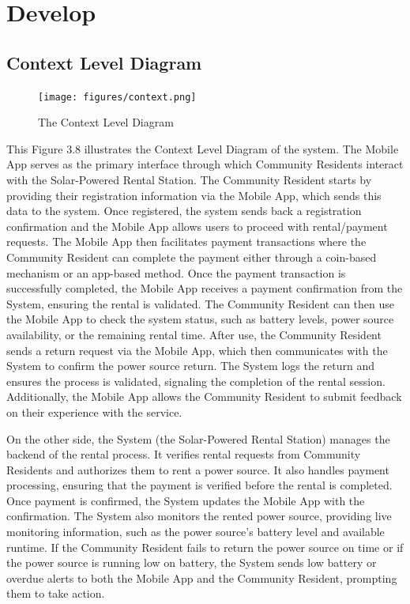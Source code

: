 {\section{Develop}

\subsection{Context Level Diagram}

\begin{figure}[H]
	\centering
	\caption{The Context Level Diagram}
	\label{fig:context level diagram}
	\texttt{[image: figures/context.png]}
\end{figure}

This Figure 3.8 illustrates the Context Level Diagram of the system. The Mobile App serves as the primary interface through which Community Residents interact with the Solar-Powered Rental Station. The Community Resident starts by providing their registration information via the Mobile App, which sends this data to the system. Once registered, the system sends back a registration confirmation and the Mobile App allows users to proceed with rental/payment requests. The Mobile App then facilitates payment transactions where the Community Resident can complete the payment either through a coin-based mechanism or an app-based method. Once the payment transaction is successfully completed, the Mobile App receives a payment confirmation from the System, ensuring the rental is validated. The Community Resident can then use the Mobile App to check the system status, such as battery levels, power source availability, or the remaining rental time. After use, the Community Resident sends a return request via the Mobile App, which then communicates with the System to confirm the power source return. The System logs the return and ensures the process is validated, signaling the completion of the rental session. Additionally, the Mobile App allows the Community Resident to submit feedback on their experience with the service.

On the other side, the System (the Solar-Powered Rental Station) manages the backend of the rental process. It verifies rental requests from Community Residents and authorizes them to rent a power source. It also handles payment processing, ensuring that the payment is verified before the rental is completed. Once payment is confirmed, the System updates the Mobile App with the confirmation. The System also monitors the rented power source, providing live monitoring information, such as the power source’s battery level and available runtime. If the Community Resident fails to return the power source on time or if the power source is running low on battery, the System sends low battery or overdue alerts to both the Mobile App and the Community Resident, prompting them to take action. 

}
